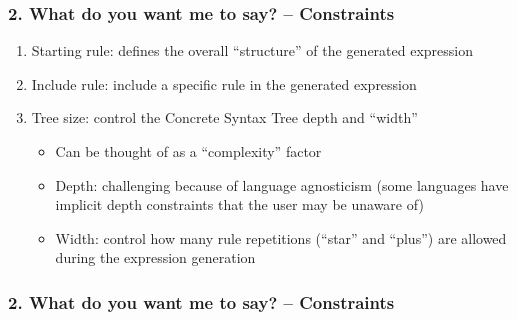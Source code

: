 \documentclass[t,aspectratio=32]{beamer}
\begin{document}
\begin{frame}
\frametitle{2. What do you want me to say? – Constraints}

\begin{enumerate}
\item Starting rule: defines the overall ``structure'' of the generated
      expression
\item Include rule: include a specific rule in the generated expression
\item Tree size: control the Concrete Syntax Tree depth and ``width''
    \begin{itemize}
    \item Can be thought of as a ``complexity'' factor
    \item Depth: challenging because of language agnosticism (some languages
          have implicit depth constraints that the user may be unaware of)
    \item Width: control how many rule repetitions (``star'' and ``plus'') are
          allowed during the expression generation
    \end{itemize}
\end{enumerate}
\end{frame}

\begin{frame}
\frametitle{2. What do you want me to say? – Constraints}

\begin{center}
\end{center}
\end{frame}
\end{document}
